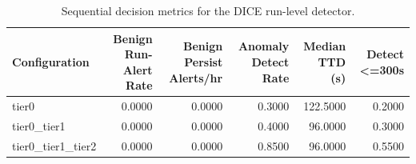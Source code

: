 \begin{table}[t]
\centering
\caption{Sequential decision metrics for the DICE run-level detector.}
\label{tab:dice_sequential_metrics}
\footnotesize
\begin{tabular}{lrrrrr}
\toprule
Configuration & Benign Run-Alert Rate & Benign Persist Alerts/hr & Anomaly Detect Rate & Median TTD (s) & Detect <=300s \\
\midrule
tier0 & 0.0000 & 0.0000 & 0.3000 & 122.5000 & 0.2000 \\
tier0_tier1 & 0.0000 & 0.0000 & 0.4000 & 96.0000 & 0.3000 \\
tier0_tier1_tier2 & 0.0000 & 0.0000 & 0.8500 & 96.0000 & 0.5500 \\
\bottomrule
\end{tabular}

\end{table}
